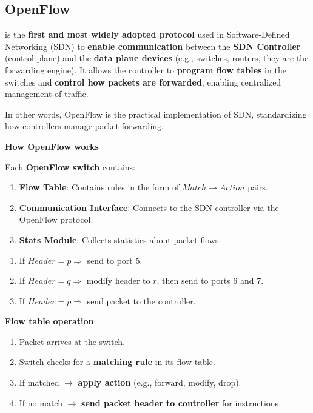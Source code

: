 \subsection{OpenFlow}\label{subsection: OpenFlow}

 is the \textbf{first and most widely adopted protocol} used in Software-Defined Networking (SDN) to \textbf{enable communication} between the \textbf{SDN Controller} (control plane) and the \textbf{data plane devices} (e.g., switches, routers, they are the forwarding engine). It allows the controller to \textbf{program flow tables} in the switches and \textbf{control how packets are forwarded}, enabling centralized management of traffic.

\highspace
In other words, OpenFlow is the practical implementation of SDN, standardizing how controllers manage packet forwarding.

\highspace
\begin{flushleft}
    \textcolor{Green3}{ \textbf{How OpenFlow works}}
\end{flushleft}
Each \textbf{OpenFlow switch} contains:
\begin{enumerate}
    \item \textbf{Flow Table}: Contains rules in the form of $Match \rightarrow Action$ pairs.
    \item \textbf{Communication Interface}: Connects to the SDN controller via the OpenFlow protocol.
    \item \textbf{Stats Module}: Collects statistics about packet flows.
\end{enumerate}

\highspace
\begin{examplebox}
    \begin{enumerate}
        \item If $Header = p \Rightarrow$ send to port 5.
        \item If $Header = q \Rightarrow$ modify header to $r$, then send to ports 6 and 7.
        \item If $Header = p \Rightarrow$ send packet to the controller.
    \end{enumerate}
\end{examplebox}

\highspace
\textbf{Flow table operation}:
\begin{enumerate}
    \item Packet arrives at the switch.
    \item Switch checks for a \textbf{matching rule} in its flow table.
    \item If matched $\rightarrow$ \textbf{apply action} (e.g., forward, modify, drop).
    \item If no match $\rightarrow$ \textbf{send packet header to controller} for instructions.
\end{enumerate}


